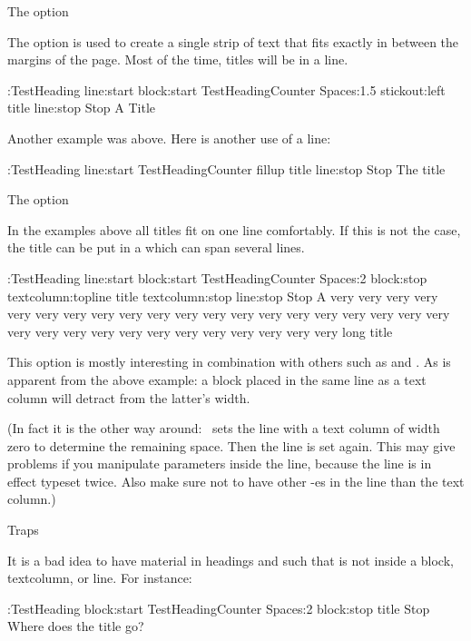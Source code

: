 The  option

The option  is used to create a single strip of text that
fits exactly in between the margins of the page. Most of the time, titles
will be in a line. 

\Example
\DefineHeading:TestHeading
    line:start block:start TestHeadingCounter Spaces:1.5 stickout:left
               title line:stop Stop
\TestHeading A Title

\endExample

Another example was above. Here is another use of a line:

\Example
\DefineHeading:TestHeading
    line:start TestHeadingCounter fillup title line:stop Stop
\TestHeading The title

\endExample

 The  option

In the examples above all titles fit on one line comfortably. If this
is not the case, the title can be put in a  which can
span several lines.

\Example
\DefineHeading:TestHeading
    line:start block:start TestHeadingCounter Spaces:2 block:stop
               textcolumn:topline title textcolumn:stop
    line:stop Stop
\TestHeading A very very very very very very very very very very very
very very very very very very very very very very very very very
very very very very very very very very long title

\endExample

This option is mostly interesting in combination with others such as
 and . As is apparent from the above example: a
block placed in the same line as a text column will detract from the
latter's width. 

(In fact it is the other way around: \Lollipop\ sets
the line with a text column of width zero to determine the remaining
space. Then the line is set again. This may give problems if you
manipulate parameters inside the line, because the line is in effect
typeset twice. Also make sure not to have other -es in the
line than the text column.)

 Traps

It is a bad idea to have material in headings and such that is not
inside a block, textcolumn, or line. For instance:

\Example
\DefineHeading:TestHeading
    block:start TestHeadingCounter Spaces:2 block:stop
    title Stop
\TestHeading Where does the title go?

